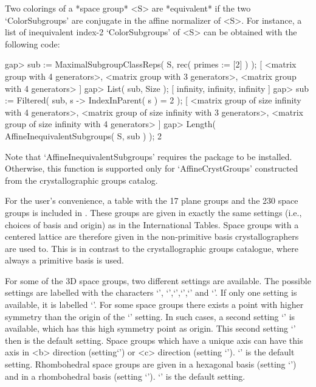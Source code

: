 Two colorings of a *space group* <S> are *equivalent* if the two
`ColorSubgroups' are conjugate in the affine normalizer of <S>.
For instance, a list of inequivalent index-2 `ColorSubgroups' of 
<S> can be obtained with the following code:

\beginexample
gap> sub := MaximalSubgroupClassReps( S, rec( primes := [2] ) );
[ <matrix group with 4 generators>, <matrix group with 3 generators>, 
  <matrix group with 4 generators> ]
gap> List( sub, Size );
[ infinity, infinity, infinity ]
gap> sub := Filtered( sub, s -> IndexInParent( s ) = 2 );
[ <matrix group of size infinity with 4 generators>, 
  <matrix group of size infinity with 3 generators>, 
  <matrix group of size infinity with 4 generators> ]
gap> Length( AffineInequivalentSubgroups( S, sub ) );
2
\endexample

Note that `AffineInequivalentSubgroups' requires the {\GAP} package 
{\CaratInterface} to be installed. Otherwise, this function is supported
only for `AffineCrystGroups' constructed from the crystallographic groups 
catalog.


For the user's convenience, a table with the 17 plane groups and the
230 space groups is included in {\Cryst}. These groups are given in 
exactly the same settings (i.e., choices of basis and origin) as in 
the International Tables. Space groups with a centered lattice are
therefore given in the non-primitive basis crystallographers are
used to. This is in contrast to the crystallographic groups catalogue,
where always a primitive basis is used.

For some of the 3D space groups, two different settings are available.
The possible settings are labelled with the characters `\pif',
`\pif',`\pif',`\pif',`\pif' and `\pif'.
If only one setting is available, it is labelled `\pif'. For
some space groups there exists a point with higher symmetry than the
origin of the `\pif' setting. In such cases, a second setting
`\pif' is available, which has this high symmetry point as
origin. This second setting `\pif' then is the default setting.
Space groups which have a unique axis can have this axis in <b>
direction (setting`\pif') or <c> direction (setting
`\pif'). `\pif' is the default setting. Rhombohedral 
space groups are given in a hexagonal basis (setting `\pif') and
in a rhombohedral basis (setting `\pif'). `\pif' is the 
default setting.

